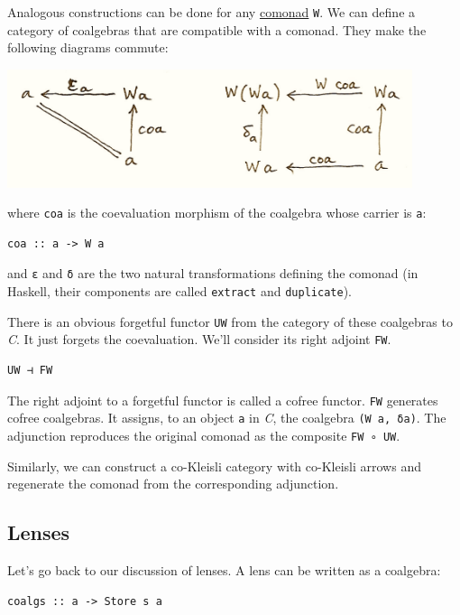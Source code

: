 Analogous constructions can be done for any
\href{https://bartoszmilewski.com/2017/01/02/comonads/}{comonad}
\texttt{W}. We can define a category of coalgebras that are compatible
with a comonad. They make the following diagrams commute:

\includegraphics[width=4.67708in]{images/talg5.png}

where \texttt{coa} is the coevaluation morphism of the coalgebra whose
carrier is \texttt{a}:

\begin{verbatim}
coa :: a -> W a
\end{verbatim}

and \texttt{ε} and \texttt{δ} are the two natural transformations
defining the comonad (in Haskell, their components are called
\texttt{extract} and \texttt{duplicate}).

There is an obvious forgetful functor \texttt{UW} from the category of
these coalgebras to \emph{C}. It just forgets the coevaluation. We'll
consider its right adjoint \texttt{FW}.

\begin{verbatim}
UW ⊣ FW
\end{verbatim}

The right adjoint to a forgetful functor is called a cofree functor.
\texttt{FW} generates cofree coalgebras. It assigns, to an object
\texttt{a} in \emph{C}, the coalgebra \texttt{(W\ a,\ δa)}. The
adjunction reproduces the original comonad as the composite
\texttt{FW\ ∘\ UW}.

Similarly, we can construct a co-Kleisli category with co-Kleisli arrows
and regenerate the comonad from the corresponding adjunction.

\subsection{Lenses}\label{lenses}

Let's go back to our discussion of lenses. A lens can be written as a
coalgebra:

\begin{verbatim}
coalgs :: a -> Store s a
\end{verbatim}

